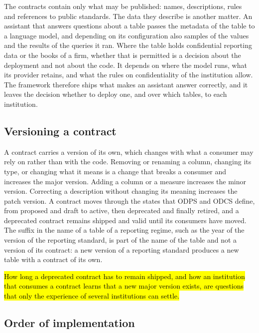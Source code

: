 \documentclass[a4paper, 11pt]{report}
\begin{document}
The contracts contain only what may be published: names, descriptions, rules and references to public standards. The data they describe is another matter. An assistant that answers questions about a table passes the metadata of the table to a language model, and depending on its configuration also samples of the values and the results of the queries it ran. Where the table holds confidential reporting data or the books of a firm, whether that is permitted is a decision about the deployment and not about the code. It depends on where the model runs, what its provider retains, and what the rules on confidentiality of the institution allow. The framework therefore ships what makes an assistant answer correctly, and it leaves the decision whether to deploy one, and over which tables, to each institution.

\subsection{Versioning a contract}

A contract carries a version of its own, which changes with what a consumer may rely on rather than with the code. Removing or renaming a column, changing its type, or changing what it means is a change that breaks a consumer and increases the major version. Adding a column or a measure increases the minor version. Correcting a description without changing its meaning increases the patch version. A contract moves through the states that ODPS and ODCS define, from proposed and draft to active, then deprecated and finally retired, and a deprecated contract remains shipped and valid until its consumers have moved. The suffix in the name of a table of a reporting regime, such as the year of the version of the reporting standard, is part of the name of the table and not a version of its contract: a new version of a reporting standard produces a new table with a contract of its own.

\hl{How long a deprecated contract has to remain shipped, and how an institution that consumes a contract learns that a new major version exists, are questions that only the experience of several institutions can settle.}

\subsection{Order of implementation}
\end{document}
